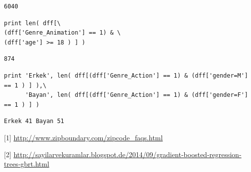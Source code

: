 \documentclass[12pt,fleqn]{article}\usepackage{../common}
\begin{document}
\begin{verbatim}
6040
\end{verbatim}

\begin{verbatim}
print len( dff[\
(dff['Genre_Animation'] == 1) & \
(dff['age'] >= 18 ) ] )
\end{verbatim}

\begin{verbatim}
874
\end{verbatim}

\begin{verbatim}
print 'Erkek', len( dff[(dff['Genre_Action'] == 1) & (dff['gender=M'] == 1 ) ] ),\
      'Bayan', len( dff[(dff['Genre_Action'] == 1) & (dff['gender=F'] == 1 ) ] )
\end{verbatim}

\begin{verbatim}
Erkek 41 Bayan 51
\end{verbatim}

[1] \url{http://www.zipboundary.com/zipcode_faqs.html}

[2] \url{http://sayilarvekuramlar.blogspot.de/2014/09/gradient-boosted-regression-trees-gbrt.html}
\end{document}
